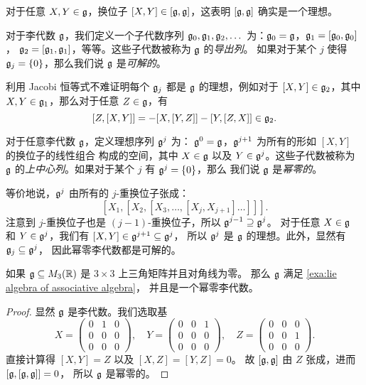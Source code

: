 对于任意 $X,Y\in\mathfrak{g}$，换位子 $[X,Y]\in[\mathfrak{g},\mathfrak{g}]$，这表明
$[\mathfrak{g},\mathfrak{g}]$ 确实是一个理想。

\begin{definition}
  对于李代数 $\mathfrak{g}$，我们定义一个子代数序列 $\mathfrak{g}_0,\mathfrak{g}_1,\mathfrak{g}_2,\dots$
  为：$\mathfrak{g}_0=\mathfrak{g}$，$\mathfrak{g}_1=[\mathfrak{g}_0,\mathfrak{g}_0]$，
  $\mathfrak{g}_2=[\mathfrak{g}_1,\mathfrak{g}_1]$，等等。这些子代数被称为 $\mathfrak{g}$ 的\emph{导出列}。
  如果对于某个 $j$ 使得 $\mathfrak{g}_j=\{0\}$，那么我们说 $\mathfrak{g}$ 是\emph{可解的}。
\end{definition}

利用 Jacobi 恒等式不难证明每个 $\mathfrak{g}_j$ 都是 $\mathfrak{g}$ 的理想，例如对于
$[X,Y]\in\mathfrak{g}_2$，其中 $X,Y\in\mathfrak{g}_1$，那么对于任意 $Z\in \mathfrak{g}$，有
\[
  [Z,[X,Y]]=-[X,[Y,Z]]-[Y,[Z,X]]\in\mathfrak{g}_2.
\]

\begin{definition}
  对于任意李代数 $\mathfrak{g}$，定义理想序列 $\mathfrak{g}^j$ 为：
  $\mathfrak{g}^0=\mathfrak{g}$，$\mathfrak{g}^{j+1}$ 为所有的形如 $[X,Y]$ 的换位子的线性组合
  构成的空间，其中 $X\in\mathfrak{g}$ 以及 $Y\in\mathfrak{g}^j$。这些子代数被称为
  $\mathfrak{g}$ 的\emph{上中心列}。如果对于某个 $j$ 有 $\mathfrak{g}^j=\{0\}$，那么
  我们说 $\mathfrak{g}$ 是\emph{幂零的}。
\end{definition}

等价地说，$\mathfrak{g}^j$ 由所有的 $j$-重换位子张成：
\[
  [X_1,[X_2,[X_3,\dots,[X_j,X_{j+1}]\dots]]].
\]
注意到 $j$-重换位子也是 $(j-1)$-重换位子，所以 $\mathfrak{g}^{j-1}\supseteq \mathfrak{g}^j$。
对于任意 $X\in\mathfrak{g}$ 和 $Y\in\mathfrak{g}^j$，我们有 $[X,Y]\in \mathfrak{g}^{j+1}\subseteq\mathfrak{g}^j$，
所以 $\mathfrak{g}^j$ 是 $\mathfrak{g}$ 的理想。此外，显然有 $\mathfrak{g}_j\subseteq \mathfrak{g}^j$，
因此幂零李代数都是可解的。

\begin{proposition}
  如果 $\mathfrak{g}\subseteq M_3(\mathbb{R})$ 是 $3\times 3$ 上三角矩阵并且对角线为零。
  那么 $\mathfrak{g}$ 满足 \autoref{exa:lie algebra of associative algebra}，
  并且是一个幂零李代数。
\end{proposition}
\begin{proof}
  显然 $\mathfrak{g}$ 是李代数。我们选取基
  \[
    X=\begin{pmatrix}
      0 & 1 & 0 \\
      0 & 0 & 0 \\
      0 & 0 & 0 
    \end{pmatrix},\quad 
    Y=\begin{pmatrix}
      0 & 0 & 1 \\
      0 & 0 & 0 \\
      0 & 0 & 0 
    \end{pmatrix},\quad
    Z=\begin{pmatrix}
      0 & 0 & 0 \\
      0 & 0 & 1 \\
      0 & 0 & 0 
    \end{pmatrix}.
  \]
  直接计算得 $[X,Y]=Z$ 以及 $[X,Z]=[Y,Z]=0$。
  故 $[\mathfrak{g},\mathfrak{g}]$ 由 $Z$ 张成，进而 $[\mathfrak{g},[\mathfrak{g},\mathfrak{g}]]=0$，
  所以 $\mathfrak{g}$ 是幂零的。
\end{proof}

